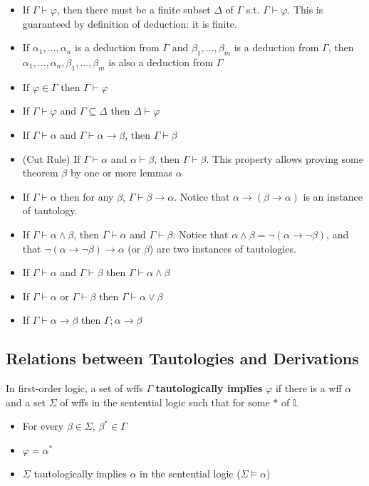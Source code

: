 \begin{itemize}
    \item If $\Gamma\vdash\varphi$, then there must be a finite subset $\Delta$ of $\Gamma$ s.t. $\Gamma\vdash\varphi$. This is guaranteed by definition of deduction: it is finite.
    \item If $\alpha_1,\dots,\alpha_n$ is a deduction from $\Gamma$ and $\beta_1,\dots,\beta_m$ is a deduction from $\Gamma$, then $\alpha_1,\dots,\alpha_n,\beta_1,\dots,\beta_m$ is also a deduction from $\Gamma$
    \item If $\varphi\in\Gamma$ then $\Gamma\vdash\varphi$
    \item If $\Gamma\vdash\varphi$ and $\Gamma\subseteq\Delta$ then $\Delta\vdash\varphi$
    \item If $\Gamma\vdash\alpha$ and $\Gamma\vdash\alpha\to\beta$, then $\Gamma\vdash\beta$
    \item (Cut Rule) If $\Gamma\vdash\alpha$ and $\alpha\vdash\beta$, then $\Gamma\vdash\beta$. This property allows proving some theorem $\beta$ by one or more lemmas $\alpha$
    \item If $\Gamma\vdash\alpha$ then for any $\beta$, $\Gamma\vdash\beta\to\alpha$. Notice that $\alpha\to\left( \beta\to\alpha \right)$ is an instance of tautology.
    \item If $\Gamma\vdash\alpha\wedge\beta$, then $\Gamma\vdash\alpha$ and $\Gamma\vdash\beta$. Notice that $\alpha\wedge\beta = \neg\left( \alpha\to\neg\beta \right)$, and that $\neg\left( \alpha\to\neg\beta \right) \to \alpha$ (or $\beta$) are two instances of tautologies.
    \item If $\Gamma\vdash\alpha$ and $\Gamma\vdash\beta$ then $\Gamma\vdash\alpha\wedge\beta$
    \item If $\Gamma\vdash\alpha$ or $\Gamma\vdash\beta$ then $\Gamma\vdash\alpha\vee\beta$
    \item If $\Gamma\vdash\alpha\to\beta$ then $\Gamma;\alpha\to\beta$
\end{itemize}

\subsection{Relations between Tautologies and Derivations}

\begin{definition}
    In first-order logic, a set of wffs $\Gamma$ \textbf{tautologically implies} $\varphi$ if there is a wff $\alpha$ and a set $\Sigma$ of wffs in the sentential logic such that for some $*$ of $\mathbb{L}$
    \begin{itemize}
        \item For every $\beta\in\Sigma$, $\beta^*\in\Gamma$
        \item $\varphi=\alpha^*$
        \item $\Sigma$ tautologically implies $\alpha$ in the sentential logic ($\Sigma\vDash\alpha$)
    \end{itemize}
\end{definition}

